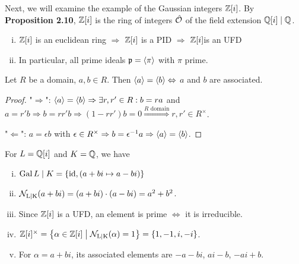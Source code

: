 
Next, we will examine the example of the Gaussian integers $\mathbb{Z}[i]$. By \textbf{Proposition 2.10}, $\mathbb{Z}[i]$ is the ring of integers $\hat{\mathcal{O}}$ of the field extension $\mathbb{Q}[i] \mid \mathbb{Q}$. 

\begin{remin}
	\begin{enumerate}[(i)]
		\item $\mathbb{Z}[i]$ is an euclidean ring $\Rightarrow$ $\mathbb{Z}[i]$ is a PID $\Rightarrow$ $\mathbb{Z}[i] $is an UFD
		
		\item In particular, all prime ideals $\mathfrak{p} = \left\langle {\pi} \right\rangle$ with $\pi$ prime.
	\end{enumerate}
\end{remin}

\begin{Bem}
	Let $R$ be a domain, $a,b \in R$. Then $\left\langle {a} \right\rangle = \left\langle {b} \right\rangle \Leftrightarrow$ $a$ and $b$ are associated.
\end{Bem}
\begin{proof}
	"$\Rightarrow$": $\left\langle {a} \right\rangle = \left\langle {b} \right\rangle \Rightarrow \exists r,r' \in R: b = ra$ and $a = r'b \Rightarrow b = rr'b \Rightarrow (1-rr')b = 0 \overset{R \text{ domain}}{\Rightarrow} r,r' \in R^\times$.
	
	"$\Leftarrow$": $a = \epsilon b$ with $\epsilon \in R^\times \Rightarrow b = \epsilon^{-1}a \Rightarrow \left\langle {a} \right\rangle = \left\langle {b} \right\rangle$.
\end{proof}

\begin{Bem}
	For $L = \mathbb{Q}[i]$ and $K = \mathbb{Q}$, we have
	\begin{enumerate}[(i)]
		\item $\operatorname{Gal} L \mid K = \left\lbrace \operatorname{id}, (a+bi \mapsto a-bi) \right\rbrace$
		
		\item $\operatorname{\mathcal{N}_{L \vert K}} (a+bi) = (a+bi) \cdot (a-bi) = a^2 + b^2$.
		
		\item Since $\mathbb{Z}[i]$ is a UFD, an element is prime $\Leftrightarrow$ it is irreducible.
		
		\item $\mathbb{Z}[i]^\times = \left\{ {\alpha \in \mathbb{Z}[i]} \bigm| {\operatorname{\mathcal{N}_{L \vert K}} (\alpha) = 1} \right\} = \left\lbrace 1, -1, i, -i \right\rbrace$.
		
		\item For $\alpha = a+bi$, its associated elements are $-a-bi$, $ai-b$, $-ai+b$.
	\end{enumerate}
\end{Bem}

